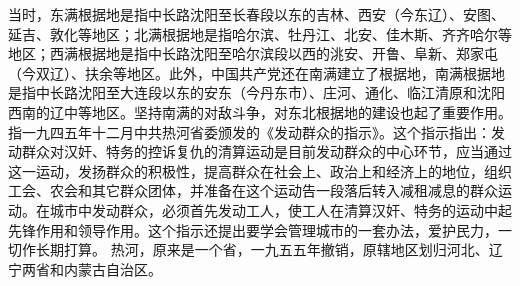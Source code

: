 \begin{maonote}
当时，东满根据地是指中长路沈阳至长春段以东的吉林、西安（今东辽）、安图、延吉、敦化等地区；北满根据地是指哈尔滨、牡丹江、北安、佳木斯、齐齐哈尔等地区；西满根据地是指中长路沈阳至哈尔滨段以西的洮安、开鲁、阜新、郑家屯（今双辽）、扶余等地区。此外，中国共产党还在南满建立了根据地，南满根据地是指中长路沈阳至大连段以东的安东（今丹东市）、庄河、通化、临江清原和沈阳西南的辽中等地区。坚持南满的对敌斗争，对东北根据地的建设也起了重要作用。
指一九四五年十二月中共热河省委颁发的《发动群众的指示》。这个指示指出：发动群众对汉奸、特务的控诉复仇的清算运动是目前发动群众的中心环节，应当通过这一运动，发扬群众的积极性，提高群众在社会上、政治上和经济上的地位，组织工会、农会和其它群众团体，并准备在这个运动告一段落后转入减租减息的群众运动。在城市中发动群众，必须首先发动工人，使工人在清算汉奸、特务的运动中起先锋作用和领导作用。这个指示还提出要学会管理城市的一套办法，爱护民力，一切作长期打算。
热河，原来是一个省，一九五五年撤销，原辖地区划归河北、辽宁两省和内蒙古自治区。
\end{maonote}
